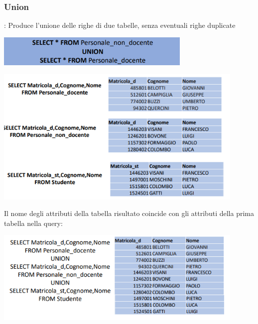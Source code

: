 \documentclass[12pt]{article}
\begin{document}
\subsubsection{Union}:
Produce l'unione delle righe di due tabelle, senza eventuali righe duplicate
\begin{center}
    \includegraphics[width = 0.70\textwidth]{Images/190.PNG}
\end{center}
\begin{center}
    \includegraphics[width = 0.90\textwidth]{Images/191.PNG}
\end{center}
\newpage
Il nome degli attributi della tabella risultato coincide con gli attributi della prima tabella nella query:
\begin{center}
    \includegraphics[width = 0.90\textwidth]{Images/192.PNG}
\end{center}
\end{document}
